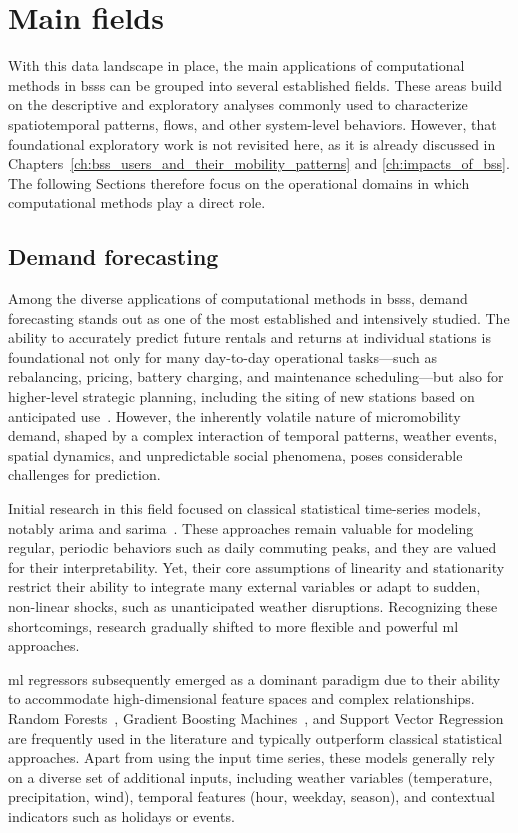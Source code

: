 \section[Main fields]{Main fields}

With this data landscape in place, the main applications of computational methods in \acp{bss} can be grouped into several established fields. These areas build on the descriptive and exploratory analyses commonly used to characterize spatiotemporal patterns, flows, and other system-level behaviors. However, that foundational exploratory work is not revisited here, as it is already discussed in Chapters~\ref{ch:bss_users_and_their_mobility_patterns} and \ref{ch:impacts_of_bss}. The following Sections therefore focus on the operational domains in which computational methods play a direct role.

    \subsection{Demand forecasting}

    Among the diverse applications of computational methods in \acp{bss}, demand forecasting stands out as one of the most established and intensively studied. The ability to accurately predict future rentals and returns at individual stations is foundational not only for many day-to-day operational tasks—such as rebalancing, pricing, battery charging, and maintenance scheduling—but also for higher-level strategic planning, including the siting of new stations based on anticipated use~\cite{Liang2023}. However, the inherently volatile nature of micromobility demand, shaped by a complex interaction of temporal patterns, weather events, spatial dynamics, and unpredictable social phenomena, poses considerable challenges for prediction.

    Initial research in this field focused on classical statistical time-series models, notably \ac{arima} and \ac{sarima}~\cite{Yoon2012, Kaltenbrunner2010}. These approaches remain valuable for modeling regular, periodic behaviors such as daily commuting peaks, and they are valued for their interpretability. Yet, their core assumptions of linearity and stationarity restrict their ability to integrate many external variables or adapt to sudden, non-linear shocks, such as unanticipated weather disruptions. Recognizing these shortcomings, research gradually shifted to more flexible and powerful \ac{ml} approaches.

    \ac{ml} regressors subsequently emerged as a dominant paradigm due to their ability to accommodate high-dimensional feature spaces and complex relationships. Random Forests~\cite{Wang2018, Ruffieux2017}, Gradient Boosting Machines~\cite{Li2015, Sathishkumar2020}, and Support Vector Regression~\cite{Sathishkumar2020} are frequently used in the literature and typically outperform classical statistical approaches. Apart from using the input time series, these models generally rely on a diverse set of additional inputs, including weather variables (temperature, precipitation, wind), temporal features (hour, weekday, season), and contextual indicators such as holidays or events.

